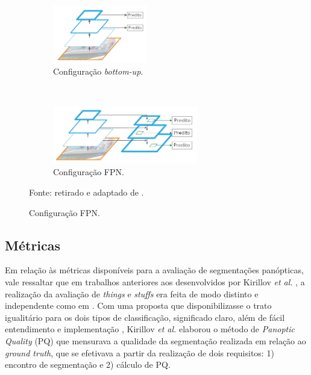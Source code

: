 \begin{figure}[H]
   \caption{Extrações de características \textit{bottom-up} e FPN.}
   \centering
   \label{panoptic:fig:2}
    \begin{subfigure}[t]{0.45\textwidth}
        \centering
        \includegraphics[height=1in]{recursos/imagens/panoptic/bottom-up.png}
        \caption{Configuração \textit{bottom-up}.}
        \label{panoptic:fig:2.1}
    \end{subfigure}%
    ~ 
    \begin{subfigure}[t]{0.45\textwidth}
        \centering
        \includegraphics[height=1in]{recursos/imagens/panoptic/FPN.png}
        \caption{Configuração FPN.}
        \label{panoptic:fig:2.2}
    \end{subfigure}%

    Fonte: retirado e adaptado de \cite{Lin2016}.
\end{figure}


\subsection{Métricas}
\label{panoptic:metrics}
Em relação às métricas disponíveis para a avaliação de segmentações panópticas, vale ressaltar que em trabalhos anteriores aos desenvolvidos por Kirillov \textit{et al.} \cite{Kirillov2019a}, a realização da avaliação de \textit{things} e \textit{stuffs} era feita de modo distinto e independente como em \cite{Sun2014, Yao2012}. Com uma proposta que disponibilizasse o trato igualitário para os dois tipos de classificação, significado claro, além de fácil entendimento e implementação , Kirillov \textit{et al.} \cite{Kirillov2019a} elaborou o método de \textit{Panoptic Quality} (PQ) que mensurava a qualidade da segmentação realizada em relação ao \textit{ground truth}, que se efetivava  a partir da realização de dois requisitos: 1) encontro de segmentação e  2) cálculo de PQ.

